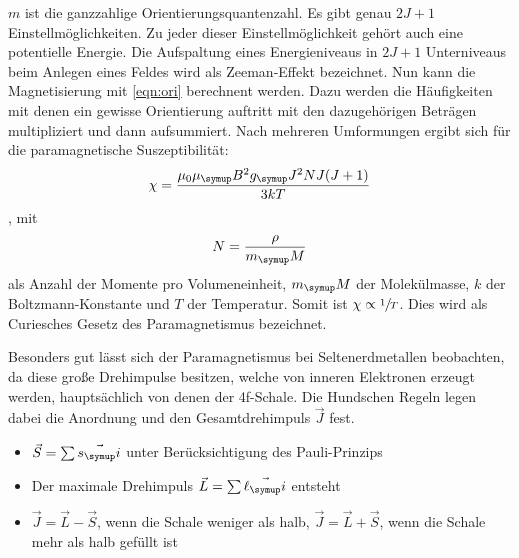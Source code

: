 $m$ ist die ganzzahlige Orientierungsquantenzahl. Es gibt genau $2J+1$
Einstellmöglichkeiten. Zu jeder dieser Einstellmöglichkeit gehört auch eine
potentielle Energie. Die Aufspaltung eines Energieniveaus in $2J+1$ Unterniveaus
beim Anlegen eines Feldes wird als Zeeman-Effekt bezeichnet.
Nun kann die Magnetisierung mit \eqref{eqn:ori} berechnent werden. Dazu werden
die Häufigkeiten mit denen ein gewisse Orientierung auftritt mit den dazugehörigen
Beträgen multipliziert und dann aufsummiert. Nach mehreren Umformungen ergibt
sich für die paramagnetische Suszeptibilität:
\begin{equation}
  \chi = \frac{\mu_0 \mu_\su{B}^2 g_\su{J}^2 N J(J+1)}{3kT} \label{eqn:chitheo}
\end{equation}
, mit
\begin{equation}
  N = \frac{\rho}{m_\su{M}} \label{eqn:momente}
\end{equation}
 als Anzahl der Momente pro Volumeneinheit, $m_\su{M}$ der Molekülmasse, $k$ der Boltzmann-Konstante
 und $T$ der Temperatur. Somit ist $\chi \propto \sfrac{1}{T}$. Dies wird als Curiesches
 Gesetz des Paramagnetismus bezeichnet.

 Besonders gut lässt sich der Paramagnetismus bei Seltenerdmetallen beobachten,
 da diese große Drehimpulse besitzen, welche von inneren Elektronen erzeugt werden,
 hauptsächlich von denen der 4f-Schale. Die Hundschen Regeln legen dabei die
 Anordnung und den Gesamtdrehimpuls $\vec{J}$ fest.
 \begin{itemize}
   \item $\vec{S} = \sum \vec{s_\su{i}}$ unter Berücksichtigung des
   Pauli-Prinzips \\
   \item Der maximale Drehimpuls $\vec{L} = \sum \vec{\ell_\su{i}}$ entsteht \\
   \item $\vec{J} = \vec{L}-\vec{S}$, wenn die Schale weniger als halb,
   $\vec{J}= \vec{L}+\vec{S}$, wenn die Schale mehr als halb gefüllt ist \\
 \end{itemize}
